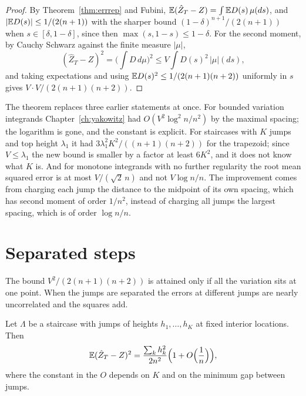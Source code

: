 \begin{proof}
By Theorem~\ref{thm:errrep} and Fubini, $\mathbb{E}(\hat Z_T - Z) = \int \mathbb{E} D(s) \, \mu(ds)$, and $|\mathbb{E} D(s)| \le 1/(2(n+1))$ with the sharper bound $(1-\delta)^{n+1} / (2(n+1))$ when $s \in [\delta, 1 - \delta]$, since then $\max(s, 1-s) \le 1 - \delta$. For the second moment, by Cauchy Schwarz against the finite measure $|\mu|$,
\[
(\hat Z_T - Z)^2 = \Big( \int D \, d\mu \Big)^2 \le V \int D(s)^2 \, |\mu|(ds) ,
\]
and taking expectations and using $\mathbb{E} D(s)^2 \le 1 / (2(n+1)(n+2))$ uniformly in $s$ gives $V \cdot V / (2(n+1)(n+2))$.
\end{proof}

The theorem replaces three earlier statements at once. For bounded variation integrands Chapter~\ref{ch:yakowitz} had $O(V^2 \log^2 n / n^2)$ by the maximal spacing; the logarithm is gone, and the constant is explicit. For staircases with $K$ jumps and top height $\lambda_1$ it had $3 \lambda_1^2 K^2 / ((n+1)(n+2))$ for the trapezoid; since $V \le \lambda_1$ the new bound is smaller by a factor at least $6K^2$, and it does not know what $K$ is. And for monotone integrands with no further regularity the root mean squared error is at most $V / (\sqrt 2 \, n)$ and not $V \log n / n$. The improvement comes from charging each jump the distance to the midpoint of its own spacing, which has second moment of order $1/n^2$, instead of charging all jumps the largest spacing, which is of order $\log n / n$.

\section{Separated steps}

The bound $V^2 / (2(n+1)(n+2))$ is attained only if all the variation sits at one point. When the jumps are separated the errors at different jumps are nearly uncorrelated and the squares add.

\begin{proposition}
\label{prop:asym}
Let $\Lambda$ be a staircase with jumps of heights $h_1, \dots, h_K$ at fixed interior locations. Then
\[
\mathbb{E} (\hat Z_T - Z)^2 = \frac{ \sum_k h_k^2 }{ 2 n^2 } \Big( 1 + O\Big( \frac{1}{n} \Big) \Big) ,
\]
where the constant in the $O$ depends on $K$ and on the minimum gap between jumps.
\end{proposition}

